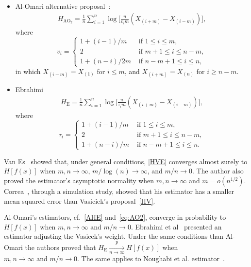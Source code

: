 \documentclass[journal]{IEEEtran}
\begin{document}
\begin{itemize}
	\item Al-Omari alternative proposal~\cite{AlOmari2016}:
	\label{AO2}
	\begin{align}
		H_{{\text{AO}}_2}=\frac{1}{n} \sum_{i=1}^{n} \log \Big[\frac{n}{v_{i} m}\left(X_{(i+m)}-X_{(i-m)}\right)\Big],
		\label{eq:AO2}
	\end{align}
	where
	\begin{equation*}
		v_{i}=\begin{cases}
			1+(i-1)/m & \text{ if }1 \leq i \leq m, \\
			2 & \text{ if } m+1 \leq i \leq n-m, \\
			1+(n-i)/2m & \text{ if } n-m+1 \leq i \leq n,
		\end{cases}
	\end{equation*}
	in which $X_{(i-m)}=X_{(1)}$ for $i \leq m$, and $X_{(i+m)}=X_{(n)}$ for $i \geq n-m$.
	\item Ebrahimi~\cite{Ebrahimi94}
	\begin{align}
		H_\text{E}=\frac{1}{n} \sum_{i=1}^{n} \log \Big[\frac{n}{\tau_{i} m}\left(X_{(i+m)}-X_{(i-m)}\right)\Big],
		\label{HE}
	\end{align}
	where
	\begin{equation*}
		\tau_{i}=\begin{cases}
			1+(i-1)/m & \text{ if }1 \leq i \leq m, \\
			2 & \text{ if } m+1 \leq i \leq n-m, \\
			1+(n-i)/m & \text{ if } n-m+1 \leq i \leq n.
		\end{cases}
	\end{equation*}
\end{itemize}

Van Es~\cite{VanEs92} showed that, under general conditions, \eqref{HVE} converges almost surely to $H[f(x)]$ when $m, n \to \infty$, $m/\log(n) \to \infty$, and $m/n \to 0$.
The author also proved the estimator's asymptotic normality when $m, n \to \infty$ and $m = o(n^{1/2})$. 
Correa~\cite{Correa95}, through a simulation study, showed that his estimator has a smaller mean squared error than Vasiciek's  proposal~\eqref{HV}. 

Al-Omari's estimators, cf.~\eqref{AHE} and~\eqref{eq:AO2}, converge in probability to $ H[f(x)]$ when $m, n \to \infty  \text{ and } m/n \to 0$. 
Ebrahimi et al~\cite{Ebrahimi94} presented an estimator adjusting the Vasicek's\cite{Vasicek76} weight. 
Under the same conditions than Al-Omari\cite{AlOmari2014} the authors proved that $H_{\text{E}}\underset{n \to \infty}{\overset{p}{\longrightarrow}} H[f(x)]$ when $m, n \to \infty  \text{ and } m/n \to 0$. 
The same applies to Noughabi et al. estimator~\cite{Noughabi2010}.
\end{document}
